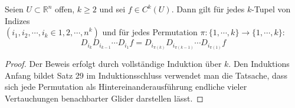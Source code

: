 Seien $ U \subset  \mathbb{R}^n  $ offen, $ k \geq 2 $ und sei $ f \in  C^{k}(U) $. Dann gilt für jedes $ k $-Tupel von Indizes \\
$ \left( i_1,i_2,\cdots,i_{k} \in  {1,2,\cdots,n}^{k} \right)  $ und für jedes Permutation $ \pi: \{1,\cdots,k\} \to \{1,\cdots,k\}: $ 
$$ D_{i_{k}} D_{i_{k-1}} \cdots D_{i_{1}} f = D_{i_{\pi(k)}} D_{i_{\pi(k-1)}} \cdots D_{i_{\pi(1)}}f  $$
\begin{proof}
	Der Beweis erfolgt durch vollständige Induktion über $ k $. Den Induktions Anfang bildet Satz 29 im Induktionsschluss verwendet 
	man die Tatsache, dass sich jede Permutation als Hintereinanderausführung endliche vieler Vertauchungen benachbarter 
	Glider darstellen lässt.

\end{proof}

%
